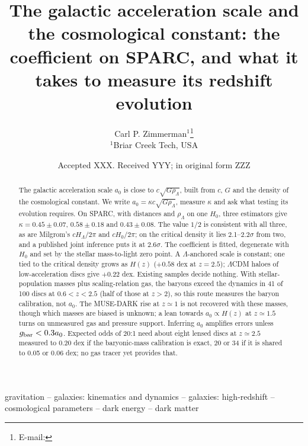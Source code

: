 \documentclass[fleqn,usenatbib]{mnras}
\title[The $a_0$--$\Lambda$ relation and its redshift test]{The galactic acceleration scale and the cosmological constant: the coefficient on SPARC, and what it takes to measure its redshift evolution}
\author[C. P. Zimmerman]{Carl P. Zimmerman$^{1}$\thanks{E-mail: \authoremail}
\\
$^{1}$Briar Creek Tech, USA}
\date{Accepted XXX. Received YYY; in original form ZZZ}
\newif\ifpapersix
\begin{document}
\label{firstpage}
\pagerange{\pageref{firstpage}--\pageref{lastpage}}
\maketitle
\ifpapersix\nocite{Zimmerman2026kappa,Zimmerman2026a0z,Zimmerman2026wall,Zimmerman2026mightee}\else\nocite{Zimmerman2026a0z,Zimmerman2026wall,Zimmerman2026mightee}\fi

\begin{abstract}
The galactic acceleration scale $a_0$ is close to $c\sqrt{G\rho_\Lambda}$, built from $c$, $G$ and the density of the cosmological constant. We write $a_0=\kappa c\sqrt{G\rho_\Lambda}$, measure $\kappa$ and ask what testing its evolution requires. On SPARC, with distances and $\rho_\Lambda$ on one $H_0$, three estimators give $\kappa=0.45\pm0.07$, $0.58\pm0.18$ and $0.43\pm0.08$. The value $1/2$ is consistent with all three, as are Milgrom's $cH_\Lambda/2\pi$ and $cH_0/2\pi$; on the critical density it lies 2.1--2.2$\sigma$ from two, and a published joint inference puts it at $2.6\sigma$. The coefficient is fitted, degenerate with $H_0$ and set by the stellar mass-to-light zero point. A $\Lambda$-anchored scale is constant; one tied to the critical density grows as $H(z)$ ($+0.58$ dex at $z=2.5$); $\Lambda$CDM haloes of low-acceleration discs give $+0.22$ dex. Existing samples decide nothing. With stellar-population masses plus scaling-relation gas, the baryons exceed the dynamics in 41 of 100 discs at $0.6<z<2.5$ (half of those at $z>2$), so this route measures the baryon calibration, not $a_0$. The MUSE-DARK rise at $z\simeq1$ is not recovered with these masses, though which masses are biased is unknown; a lean towards $a_0\propto H(z)$ at $z\simeq1.5$ turns on unmeasured gas and pressure support. Inferring $a_0$ amplifies errors unless $g_{\rm bar}<0.3a_0$. Expected odds of 20:1 need about eight lensed discs at $z\simeq2.5$ measured to 0.20 dex if the baryonic-mass calibration is exact, 20 or 34 if it is shared to 0.05 or 0.06 dex; no gas tracer yet provides that.
\end{abstract}

\begin{keywords}
gravitation -- galaxies: kinematics and dynamics -- galaxies: high-redshift -- cosmological parameters -- dark energy -- dark matter
\end{keywords}
\end{document}
